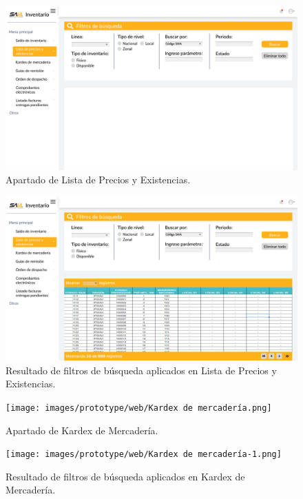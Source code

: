 \documentclass{scrreprt}
\begin{document}
    
    \FloatBarrier
    \begin{figure}[!htpb]
        \centerline{\includegraphics[scale=.24]{images/prototype/web/Saldo de precios y existencias.png}}
        \caption{Apartado de Lista de Precios y Existencias.}
        \label{fig}
    \end{figure}
    \FloatBarrier
    \begin{figure}[!htpb]
        \centerline{\includegraphics[scale=.20]{images/prototype/web/Saldo de precios y existencias 2.png}}
        \caption{Resultado de filtros de búsqueda aplicados en Lista de Precios y Existencias.}
        \label{fig}
    \end{figure}
    \FloatBarrier
    
    
    \begin{figure}[!htpb]
        \centerline{\texttt{[image: images/prototype/web/Kardex de mercadería.png]}}
        \caption{Apartado de Kardex de Mercadería.}
        \label{fig}
    \end{figure}
    \FloatBarrier
    \begin{figure}[!htpb]
        \centerline{\texttt{[image: images/prototype/web/Kardex de mercadería-1.png]}}
        \caption{Resultado de filtros de búsqueda aplicados en Kardex de Mercadería.}
        \label{fig}
    \end{figure}
    \FloatBarrier
    
\end{document}
